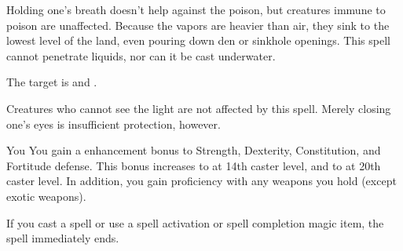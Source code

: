 Holding one's breath doesn't help against the poison, but creatures immune to poison are unaffected. Because the vapors are heavier than air, they sink to the lowest level of the land, even pouring down den or sinkhole openings. This spell cannot penetrate liquids, nor can it be cast underwater.

\begin{spelltargets}
    \spellsuccess The target is \dazzled and \bewildered.
\end{spelltargets}
\spellnotes Creatures who cannot see the light are not affected by this spell. Merely closing one's eyes is insufficient protection, however.

\spellrng{\rngpers}
\spelldur{\durshort \dismissable}
\begin{spelltarget}{You}
    \spelleffect You gain a  enhancement bonus to Strength, Dexterity, Constitution, and Fortitude defense. This bonus increases to  at 14th caster level, and to  at 20th caster level. In addition, you gain proficiency with any weapons you hold (except exotic weapons).
\end{spelltarget}
\spellnotes If you cast a spell or use a spell activation or spell completion magic item, the spell immediately ends.


